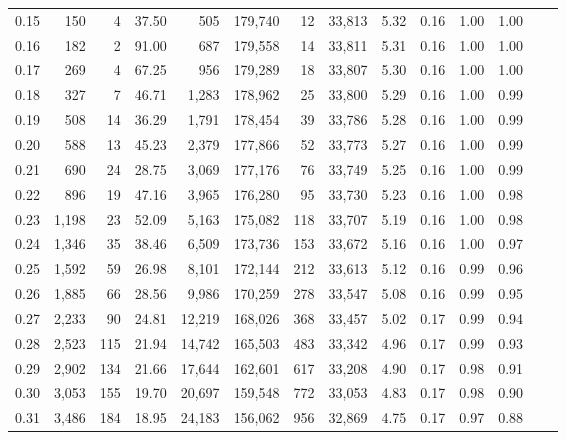 \begin{tabular}{rrrrrrrrrrrrrr}
0.15 &    150 &      4 &   37.50 &      505 &  179,740 &      12 &  33,813 &  5.32 &  0.16 &  1.00 &      1.00 \\
0.16 &    182 &      2 &   91.00 &      687 &  179,558 &      14 &  33,811 &  5.31 &  0.16 &  1.00 &      1.00 \\
0.17 &    269 &      4 &   67.25 &      956 &  179,289 &      18 &  33,807 &  5.30 &  0.16 &  1.00 &      1.00 \\
0.18 &    327 &      7 &   46.71 &    1,283 &  178,962 &      25 &  33,800 &  5.29 &  0.16 &  1.00 &      0.99 \\
0.19 &    508 &     14 &   36.29 &    1,791 &  178,454 &      39 &  33,786 &  5.28 &  0.16 &  1.00 &      0.99 \\
0.20 &    588 &     13 &   45.23 &    2,379 &  177,866 &      52 &  33,773 &  5.27 &  0.16 &  1.00 &      0.99 \\
0.21 &    690 &     24 &   28.75 &    3,069 &  177,176 &      76 &  33,749 &  5.25 &  0.16 &  1.00 &      0.99 \\
0.22 &    896 &     19 &   47.16 &    3,965 &  176,280 &      95 &  33,730 &  5.23 &  0.16 &  1.00 &      0.98 \\
0.23 &  1,198 &     23 &   52.09 &    5,163 &  175,082 &     118 &  33,707 &  5.19 &  0.16 &  1.00 &      0.98 \\
0.24 &  1,346 &     35 &   38.46 &    6,509 &  173,736 &     153 &  33,672 &  5.16 &  0.16 &  1.00 &      0.97 \\
0.25 &  1,592 &     59 &   26.98 &    8,101 &  172,144 &     212 &  33,613 &  5.12 &  0.16 &  0.99 &      0.96 \\
0.26 &  1,885 &     66 &   28.56 &    9,986 &  170,259 &     278 &  33,547 &  5.08 &  0.16 &  0.99 &      0.95 \\
0.27 &  2,233 &     90 &   24.81 &   12,219 &  168,026 &     368 &  33,457 &  5.02 &  0.17 &  0.99 &      0.94 \\
0.28 &  2,523 &    115 &   21.94 &   14,742 &  165,503 &     483 &  33,342 &  4.96 &  0.17 &  0.99 &      0.93 \\
0.29 &  2,902 &    134 &   21.66 &   17,644 &  162,601 &     617 &  33,208 &  4.90 &  0.17 &  0.98 &      0.91 \\
0.30 &  3,053 &    155 &   19.70 &   20,697 &  159,548 &     772 &  33,053 &  4.83 &  0.17 &  0.98 &      0.90 \\
0.31 &  3,486 &    184 &   18.95 &   24,183 &  156,062 &     956 &  32,869 &  4.75 &  0.17 &  0.97 &      0.88 \\

\end{tabular}
